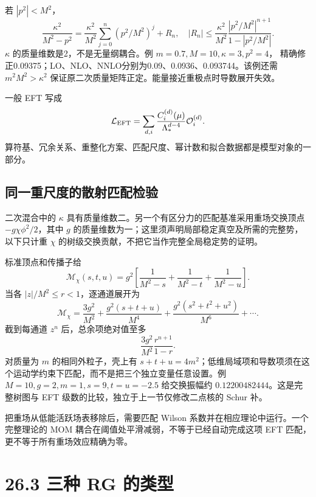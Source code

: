 \documentclass[
  11pt,
  oneside]{book}
\begin{document}
若 \(|p^2|<M^2\)， \[
\frac{\kappa^2}{M^2-p^2}
=\frac{\kappa^2}{M^2}\sum_{j=0}^{n}(p^2/M^2)^j+R_n,\quad
|R_n|\le\frac{\kappa^2}{M^2}
\frac{|p^2/M^2|^{n+1}}{1-|p^2/M^2|}.
\] \(\kappa\) 的质量维数是2，不是无量纲耦合。例
\(m=0.7,M=10,\kappa=3,p^2=4\)，
精确修正0.09375；LO、NLO、NNLO分别为0.09、0.0936、0.093744。该例还需
\(m^2M^2>\kappa^2\)
保证原二次质量矩阵正定。能量接近重极点时导数展开失效。

一般 EFT 写成 \[
\mathcal L_{\rm EFT}=\sum_{d,i}\frac{C_i^{(d)}(\mu)}
{\Lambda_*^{d-4}}\mathcal O_i^{(d)}.
\]
算符基、冗余关系、重整化方案、匹配尺度、幂计数和拟合数据都是模型对象的一部分。

\hypertarget{ux540cux4e00ux91cdux5c3aux5ea6ux7684ux6563ux5c04ux5339ux914dux68c0ux9a8c}{%
\subsection{同一重尺度的散射匹配检验}\label{ux540cux4e00ux91cdux5c3aux5ea6ux7684ux6563ux5c04ux5339ux914dux68c0ux9a8c}}

二次混合中的 \(\kappa\)
具有质量维数二。另一个有区分力的匹配基准采用重场交换顶点
\(-g\chi\phi^2/2\)，其中 \(g\)
的质量维数为一；这里须声明局部稳定真空及所需的完整势，以下只计重
\(\chi\) 的树级交换贡献，不把它当作完整全局稳定势的证明。

标准顶点和传播子给 \[
\mathcal M_\chi(s,t,u)=g^2\left[\frac1{M^2-s}+\frac1{M^2-t}+\frac1{M^2-u}\right].
\] 当各 \(|z|/M^2\le r<1\)，逐通道展开为 \[
\mathcal M_\chi=
\frac{3g^2}{M^2}+\frac{g^2(s+t+u)}{M^4}
+\frac{g^2(s^2+t^2+u^2)}{M^6}+\cdots.
\] 截到每通道 \(z^n\) 后，总余项绝对值至多 \[
\frac{3g^2}{M^2}\frac{r^{n+1}}{1-r}.
\] 对质量为 \(m\) 的相同外粒子，壳上有
\(s+t+u=4m^2\)；低维局域项和导数项须在这个运动学约束下匹配，而不是把三个独立变量任意设置。例
\(M=10,g=2,m=1,s=9,t=u=-2.5\) 给交换振幅约
\(0.12200482444\)。这是完整树图与 EFT
级数的比较，独立于上一节仅修改二点核的 Schur 补。

把重场从低能活跃场表移除后，需要匹配 Wilson
系数并在相应理论中运行。一个完整理论的 MOM
耦合在阈值处平滑减弱，不等于已经自动完成这项 EFT
匹配，更不等于所有重场效应精确为零。

\hypertarget{ux4e09ux79cd-rg-ux7684ux7c7bux578b}{%
\section{26.3 三种 RG 的类型}\label{ux4e09ux79cd-rg-ux7684ux7c7bux578b}}
\end{document}
